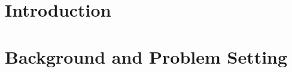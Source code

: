 \documentclass[10pt]{article} %
\begin{document}
\begin{abstract}
\end{abstract}

\section{Introduction}
\label{sec: introduction}


\section{Background and Problem Setting}
\label{sec: background}

\end{document}
